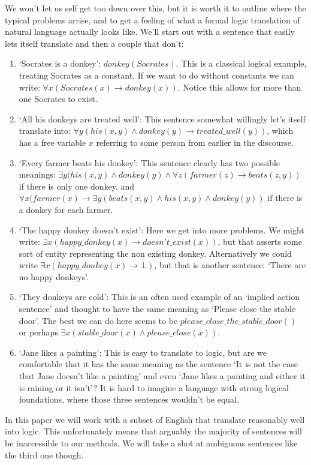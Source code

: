 \documentclass[12pt]{article}
\begin{document}
We won't let us self get too down over this, but it is worth it to outline where the typical problems arrise, and to get a feeling of what a formal logic translation of natural language actually looks like. We'll start out with a sentence that easily lets itself translate and then a couple that don't:
\begin{enumerate}
\item `Socrates is a donkey': $donkey(Socrates)$. This is a classical logical example, treating Socrates as a constant. If we want to do without constants we can write: $\forall x(Socrates(x)\rightarrow donkey(x))$. Notice this allows for more than one Socrates to exist.
\item `All his donkeys are treated well': This sentence somewhat willingly let's itself translate into: $\forall y(his(x,y)\wedge donkey(y) \rightarrow treated\_well(y))$, which has a free variable $x$ referring to some person from earlier in the discourse.
\item `Every farmer beats his donkey': This sentence clearly has two possible meanings: $\exists y(his(x,y)\wedge donkey(y)\wedge \forall z(farmer(z) \rightarrow beats(z,y))$ if there is only one donkey, and $\forall x(farmer(x)\rightarrow \exists y (beats(x,y)\wedge his(x,y)\wedge donkey(y))$ if there is a donkey for each farmer.
\item `The happy donkey doesn't exist': Here we get into more problems. We might write: $\exists x(happy\_donkey(x)\rightarrow doesn't\_exist(x))$, but that asserts some sort of entity representing the non existing donkey. Alternatively we could write $\exists x(happy\_donkey(x)\rightarrow \bot)$, but that is another sentence: `There are no happy donkeys'.
\item `They donkeys are cold': This is an often used example of an `implied action sentence' and thought to have the same meaning as `Please close the stable door'. The best we can do here seems to be $please\_close\_the\_stable\_door()$ or perhaps $\exists x(stable\_door(x)\wedge please\_close(x))$.
\item `Jane likes a painting': This is easy to translate to logic, but are we comfortable that it has the same meaning as the sentence `It is not the case that Jane doesn't like a painting' and even `Jane likes a painting and either it is raining or it isn't'? It is hard to imagine a language with strong logical foundations, where those three sentences wouldn't be equal.
\end{enumerate}

In this paper we will work with a subset of English that translate reasonably well into logic. This unfortunately means that arguably the majority of sentences will be inaccessible to our methods. We will take a shot at ambiguous sentences like the third one though.
\end{document}
